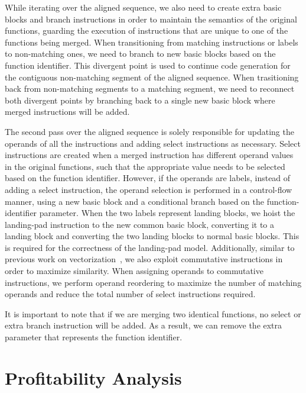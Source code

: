 While iterating over the aligned sequence, we also need to create extra basic
blocks and branch instructions in order to maintain the semantics of the
original functions, guarding the execution of instructions that are unique to
one of the functions being merged.
When transitioning from matching instructions or labels to non-matching ones,
we need to branch to new basic blocks based on the function identifier.
This divergent point is used to continue code generation for the contiguous
non-matching segment of the aligned sequence.
When trasitioning back from non-matching segments to a matching segment, we need
to reconnect both divergent points by branching back to a single new basic block
where merged instructions will be added.

The second pass over the aligned sequence is solely responsible for updating
the operands of all the instructions and adding select instructions as necessary.
Select instructions are created when a merged instruction has different operand
values in the original functions, such that the appropriate value needs to be
selected based on the function identifier.
However, if the operands are labels, instead of adding a select instruction,
the operand selection is performed in a control-flow manner, using a new basic
block and a conditional branch based on the function-identifier parameter.
When the two labels represent landing blocks, we hoist the landing-pad
instruction to the new common basic block, converting it to a landing block and
converting the two landing blocks to normal basic blocks.
This is required for the correctness of the landing-pad model.
Additionally, similar to previous work on vectorization~\cite{porpodas18}, we
also exploit commutative instructions in order to maximize similarity.
When assigning operands to commutative instructions, we perform operand
reordering to maximize the number of matching operands and reduce the total
number of select instructions required.

It is important to note that if we are merging two identical functions, no
select or extra branch instruction will be added.
As a result, we can remove the extra parameter that represents the function
identifier.

\section{Profitability Analysis}
\label{sec:framework}



